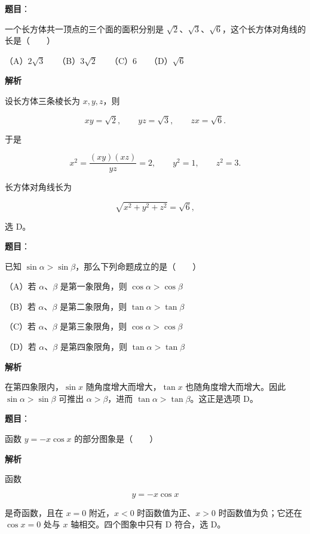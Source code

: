 \begin{answer}

\textbf{题目}：

一个长方体共一顶点的三个面的面积分别是 $\sqrt2$、$\sqrt3$、$\sqrt6$，这个长方体对角线的长是\mbox{（　　）}

（A）$2\sqrt3$　　（B）$3\sqrt2$　　（C）6　　（D）$\sqrt6$

\textbf{解析}

设长方体三条棱长为 $x,y,z$，则

\nopagebreak[4]
\[
xy=\sqrt2,\qquad yz=\sqrt3,\qquad zx=\sqrt6.
\]

于是

\nopagebreak[4]
\[
x^2=\frac{(xy)(xz)}{yz}=2,\qquad
y^2=1,\qquad z^2=3.
\]

长方体对角线长为

\nopagebreak[4]
\[
\sqrt{x^2+y^2+z^2}=\sqrt6,
\]

选 D。


\end{answer}
\begin{answer}

\textbf{题目}：

已知 $\sin\alpha>\sin\beta$，那么下列命题成立的是\mbox{（　　）}

（A）若 $\alpha$、$\beta$ 是第一象限角，则 $\cos\alpha>\cos\beta$

（B）若 $\alpha$、$\beta$ 是第二象限角，则 $\tan\alpha>\tan\beta$

（C）若 $\alpha$、$\beta$ 是第三象限角，则 $\cos\alpha>\cos\beta$

（D）若 $\alpha$、$\beta$ 是第四象限角，则 $\tan\alpha>\tan\beta$

\textbf{解析}

在第四象限内，$\sin x$ 随角度增大而增大，$\tan x$ 也随角度增大而增大。因此 $\sin\alpha>\sin\beta$ 可推出 $\alpha>\beta$，进而 $\tan\alpha>\tan\beta$。这正是选项 D。


\end{answer}
\begin{answer}

\textbf{题目}：

函数 $y=-x\cos x$ 的部分图象是\mbox{（　　）}
\nopagebreak[4]
\begin{center}\end{center}
\nopagebreak[4]
\textbf{解析}

函数

\nopagebreak[4]
\[
y=-x\cos x
\]

是奇函数，且在 $x=0$ 附近，$x<0$ 时函数值为正、$x>0$ 时函数值为负；它还在 $\cos x=0$ 处与 $x$ 轴相交。四个图象中只有 D 符合，选 D。


\end{answer}
